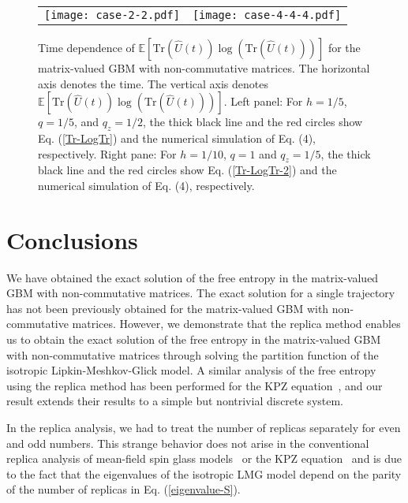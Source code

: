 \documentclass[
aps,
pre,
showpacs
]{revtex4-1}
\newcommand{\Tr}{\mbox{Tr} }
\begin{document}
\begin{figure}[H]
\begin{tabular}{cc}
\begin{minipage}[t]{0.45\hsize}
\centering
\texttt{[image: case-2-2.pdf]}
\end{minipage} &
\begin{minipage}[t]{0.45\hsize}
\centering
\texttt{[image: case-4-4-4.pdf]}
\end{minipage}
\end{tabular}
\caption{Time dependence of $\mathbb{E} \left[ \Tr \left(\hat{U}(t)\right)\log\left( \Tr \left(\hat{U}(t)\right) \right) \right]$ for the matrix-valued GBM with non-commutative matrices. 
The horizontal axis denotes the time. The vertical axis denotes $\mathbb{E} \left[ \Tr \left(\hat{U}(t)\right)\log\left( \Tr \left(\hat{U}(t)\right) \right) \right]$.
Left panel: For $h=1/5$, $q=1/5$, and $q_z=1/2$, the thick black line and the red circles show Eq. (\ref{Tr-LogTr}) and the numerical simulation of Eq. (4), respectively.
Right pane: For $h=1/10$, $q=1$ and $q_z=1/5$, the thick black line and the red circles show Eq. (\ref{Tr-LogTr-2}) and the numerical simulation of Eq. (4), respectively.}
\label{fig2}
\end{figure}



\section{Conclusions}
We have obtained the exact solution of the free entropy in the matrix-valued GBM with non-commutative matrices.
The exact solution for a single trajectory has not been previously obtained for the matrix-valued GBM with non-commutative matrices. However, we demonstrate that the replica method enables us to obtain the exact solution of the free entropy in the matrix-valued GBM with non-commutative matrices through solving the partition function of the isotropic Lipkin-Meshkov-Glick model.
A similar analysis of the free entropy using the replica method has been performed for the KPZ equation~\cite{CDR,Dotsenko2}, and our result extends their results to a simple but nontrivial discrete system.


In the replica analysis, we had to treat the number of replicas separately for even and odd numbers.
This strange behavior does not arise in the conventional replica analysis of mean-field spin glass models~\cite{Nishimori} or the KPZ equation~\cite{CDR,Dotsenko2} and is due to the fact that the eigenvalues of the isotropic LMG model depend on the parity of the number of replicas in Eq. (\ref{eigenvalue-S}).
\end{document}
